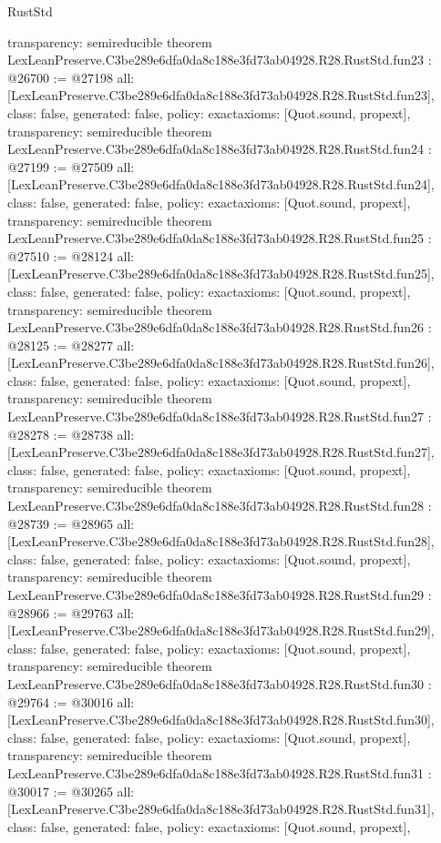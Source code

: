 \begin{lexlean}{RustStd}
\begin{coremodule}
{  transparency: semireducible
}
theorem LexLeanPreserve.C3be289e6dfa0da8c188e3fd73ab04928.R28.RustStd.fun23 : @26700 := @27198 {
  all: [LexLeanPreserve.C3be289e6dfa0da8c188e3fd73ab04928.R28.RustStd.fun23],
  class: false,
  generated: false,
  policy: exact{axioms: [Quot.sound, propext]},
  transparency: semireducible
}
theorem LexLeanPreserve.C3be289e6dfa0da8c188e3fd73ab04928.R28.RustStd.fun24 : @27199 := @27509 {
  all: [LexLeanPreserve.C3be289e6dfa0da8c188e3fd73ab04928.R28.RustStd.fun24],
  class: false,
  generated: false,
  policy: exact{axioms: [Quot.sound, propext]},
  transparency: semireducible
}
theorem LexLeanPreserve.C3be289e6dfa0da8c188e3fd73ab04928.R28.RustStd.fun25 : @27510 := @28124 {
  all: [LexLeanPreserve.C3be289e6dfa0da8c188e3fd73ab04928.R28.RustStd.fun25],
  class: false,
  generated: false,
  policy: exact{axioms: [Quot.sound, propext]},
  transparency: semireducible
}
theorem LexLeanPreserve.C3be289e6dfa0da8c188e3fd73ab04928.R28.RustStd.fun26 : @28125 := @28277 {
  all: [LexLeanPreserve.C3be289e6dfa0da8c188e3fd73ab04928.R28.RustStd.fun26],
  class: false,
  generated: false,
  policy: exact{axioms: [Quot.sound, propext]},
  transparency: semireducible
}
theorem LexLeanPreserve.C3be289e6dfa0da8c188e3fd73ab04928.R28.RustStd.fun27 : @28278 := @28738 {
  all: [LexLeanPreserve.C3be289e6dfa0da8c188e3fd73ab04928.R28.RustStd.fun27],
  class: false,
  generated: false,
  policy: exact{axioms: [Quot.sound, propext]},
  transparency: semireducible
}
theorem LexLeanPreserve.C3be289e6dfa0da8c188e3fd73ab04928.R28.RustStd.fun28 : @28739 := @28965 {
  all: [LexLeanPreserve.C3be289e6dfa0da8c188e3fd73ab04928.R28.RustStd.fun28],
  class: false,
  generated: false,
  policy: exact{axioms: [Quot.sound, propext]},
  transparency: semireducible
}
theorem LexLeanPreserve.C3be289e6dfa0da8c188e3fd73ab04928.R28.RustStd.fun29 : @28966 := @29763 {
  all: [LexLeanPreserve.C3be289e6dfa0da8c188e3fd73ab04928.R28.RustStd.fun29],
  class: false,
  generated: false,
  policy: exact{axioms: [Quot.sound, propext]},
  transparency: semireducible
}
theorem LexLeanPreserve.C3be289e6dfa0da8c188e3fd73ab04928.R28.RustStd.fun30 : @29764 := @30016 {
  all: [LexLeanPreserve.C3be289e6dfa0da8c188e3fd73ab04928.R28.RustStd.fun30],
  class: false,
  generated: false,
  policy: exact{axioms: [Quot.sound, propext]},
  transparency: semireducible
}
theorem LexLeanPreserve.C3be289e6dfa0da8c188e3fd73ab04928.R28.RustStd.fun31 : @30017 := @30265 {
  all: [LexLeanPreserve.C3be289e6dfa0da8c188e3fd73ab04928.R28.RustStd.fun31],
  class: false,
  generated: false,
  policy: exact{axioms: [Quot.sound, propext]},
}
\end{coremodule}
\end{lexlean}
